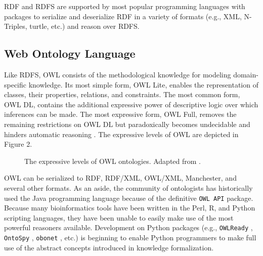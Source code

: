 RDF and RDFS are supported by most popular programming languages with packages to serialize and deserialize \ac{RDF} in a variety of formats (e.g., \ac{XML}, N-Triples, turtle, etc.) and reason over \ac{RDFS}.
    
\subsection{Web Ontology Language}

Like \ac{RDFS}, \ac{OWL} consists of the methodological knowledge for modeling domain-specific knowledge. Its most simple form, \ac{OWL} Lite, enables the representation of classes, their properties, relations, and constraints. The most common form, \ac{OWL} \ac{DL}, contains the additional expressive power of descriptive logic over which inferences can be made. The most expressive form, \ac{OWL} Full, removes the remaining restrictions on \ac{OWL} \ac{DL} but paradoxically becomes undecidable and hinders automatic reasoning \cite{Marchetti2008}. The expressive levels of \ac{OWL} are depicted in Figure 2.

\begin{figure}
\captionsetup{format=plain}
\caption[Descriptive Levels of OWL]{The expressive levels of OWL ontologies. Adapted from \cite{Marchetti2008}.}
\label{Fig:owl_types}
\end{figure}

\ac{OWL} can be serialized to \ac{RDF}, RDF/XML, OWL/XML, Manchester, and several other formats. As an aside, the community of ontologists has historically used the Java programming language because of the definitive \verb|OWL API| \cite{owlapi} package. Because many bioinformatics tools have been written in the Perl, R, and Python scripting languages, they have been unable to easily make use of the most powerful reasoners available. Development on Python packages (e.g., \verb|OWLReady| \cite{owlready}, \verb|OntoSpy| \cite{ontospy}, \verb|obonet| \cite{obonet}, etc.) is beginning to enable Python programmers to make full use of the abstract concepts introduced in knowledge formalization.

